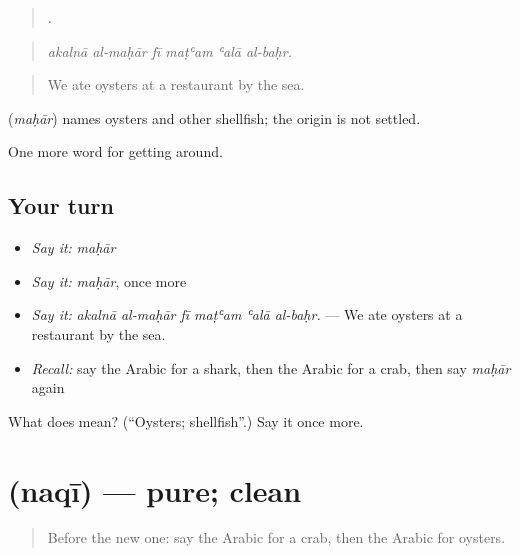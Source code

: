 \begin{quote}
     .
\end{quote}

\begin{quote}
\emph{akalnā al-maḥār fī maṭʿam ʿalā al-baḥr.}
\end{quote}

\begin{quote}
We ate oysters at a restaurant by the sea.
\end{quote}

\begin{cousinweb}
\textbf{} (\emph{maḥār}) names oysters and other shellfish; the origin is not settled.
\end{cousinweb}

\begin{grammarlens}[title={What you've built}]
One more word for getting around.
\end{grammarlens}

\subsection*{Your turn}
\begin{itemize}
\raggedright
  \item \emph{Say it:} \emph{maḥār}
  \item \emph{Say it:} \emph{maḥār}, once more
  \item \emph{Say it:} \emph{akalnā al-maḥār fī maṭʿam ʿalā al-baḥr.} — We ate oysters at a restaurant by the sea.
  \item \emph{Recall:} say the Arabic for a shark, then the Arabic for a crab, then say \emph{maḥār} again
\end{itemize}

\begin{tcolorbox}[breakable,colback=teal!4,colframe=teal!35!black,title={Before you move on}]
What does  mean? (\textquotedblleft{}Oysters; shellfish\textquotedblright{}.) Say it once more.
\end{tcolorbox}
\section[\texorpdfstring{\ar{نقي} (naqī)}{نقي (naqī)}]{ (naqī) — pure; clean}

\label{lesson:AR-C477-naqi}



\begin{quote}
Before the new one: say the Arabic for a crab, then the Arabic for oysters.
\end{quote}


